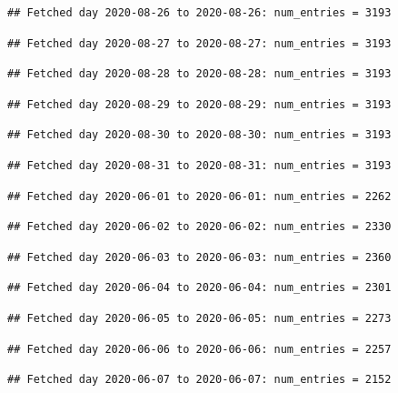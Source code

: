 \documentclass[]{article}
\begin{document}
\begin{verbatim}
## Fetched day 2020-08-26 to 2020-08-26: num_entries = 3193
\end{verbatim}

\begin{verbatim}
## Fetched day 2020-08-27 to 2020-08-27: num_entries = 3193
\end{verbatim}

\begin{verbatim}
## Fetched day 2020-08-28 to 2020-08-28: num_entries = 3193
\end{verbatim}

\begin{verbatim}
## Fetched day 2020-08-29 to 2020-08-29: num_entries = 3193
\end{verbatim}

\begin{verbatim}
## Fetched day 2020-08-30 to 2020-08-30: num_entries = 3193
\end{verbatim}

\begin{verbatim}
## Fetched day 2020-08-31 to 2020-08-31: num_entries = 3193
\end{verbatim}

\begin{verbatim}
## Fetched day 2020-06-01 to 2020-06-01: num_entries = 2262
\end{verbatim}

\begin{verbatim}
## Fetched day 2020-06-02 to 2020-06-02: num_entries = 2330
\end{verbatim}

\begin{verbatim}
## Fetched day 2020-06-03 to 2020-06-03: num_entries = 2360
\end{verbatim}

\begin{verbatim}
## Fetched day 2020-06-04 to 2020-06-04: num_entries = 2301
\end{verbatim}

\begin{verbatim}
## Fetched day 2020-06-05 to 2020-06-05: num_entries = 2273
\end{verbatim}

\begin{verbatim}
## Fetched day 2020-06-06 to 2020-06-06: num_entries = 2257
\end{verbatim}

\begin{verbatim}
## Fetched day 2020-06-07 to 2020-06-07: num_entries = 2152
\end{verbatim}
\end{document}
